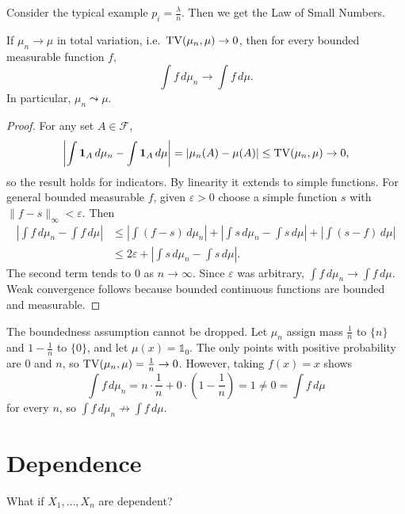 \begin{example}
	Consider the typical example $p_i = \frac{\lambda}{n}$. Then we get the Law of Small Numbers.
\end{example}

\begin{proposition}
	If $\mu_n \to \mu$ in total variation, i.e.\ $\operatorname{TV}(\mu_n, \mu) \to 0$, then for every bounded measurable function $f$,
	\[
		\int f\,d\mu_n \to \int f\,d\mu.
	\]
	In particular, $\mu_n \leadsto \mu$.
\end{proposition}

\begin{proof}
	For any set $A \in \mathscr{F}$,
	\[
		\left|\int \mathbf{1}_A\,d\mu_n - \int \mathbf{1}_A\,d\mu\right| = |\mu_n(A) - \mu(A)| \le \operatorname{TV}(\mu_n,\mu) \to 0,
	\]
	so the result holds for indicators. By linearity it extends to simple functions. For general bounded measurable $f$, given $\varepsilon > 0$ choose a simple function $s$ with $\|f - s\|_\infty < \varepsilon$. Then
	\begin{align*}
		\left|\int f\,d\mu_n - \int f\,d\mu\right|
		&\le \left|\int (f-s)\,d\mu_n\right| + \left|\int s\,d\mu_n - \int s\,d\mu\right| + \left|\int (s-f)\,d\mu\right| \\
		&\le 2\varepsilon + \left|\int s\,d\mu_n - \int s\,d\mu\right|.
	\end{align*}
	The second term tends to $0$ as $n \to \infty$. Since $\varepsilon$ was arbitrary, $\int f\,d\mu_n \to \int f\,d\mu$. Weak convergence follows because bounded continuous functions are bounded and measurable.
\end{proof}

\begin{example}
	The boundedness assumption cannot be dropped. Let $\mu_n$ assign mass $\tfrac{1}{n}$ to $\{n\}$ and $1 - \tfrac{1}{n}$ to $\{0\}$, and let $\mu(x) = \mathds{1}_{0}$. The only points with positive probability are $0$ and $n$, so $\operatorname{TV}(\mu_n, \mu) = \frac{1}{n} \to 0$. However, taking $f(x) = x$ shows
	\[
		\int f\,d\mu_n = n \cdot \frac{1}{n} + 0 \cdot \left(1 - \frac{1}{n}\right) = 1 \ne 0 = \int f\,d\mu
	\]
	for every $n$, so $\int f\,d\mu_n \not\to \int f\,d\mu$.
\end{example}

\section{Dependence}


What if $X_1,\ldots,X_n$ are dependent?

